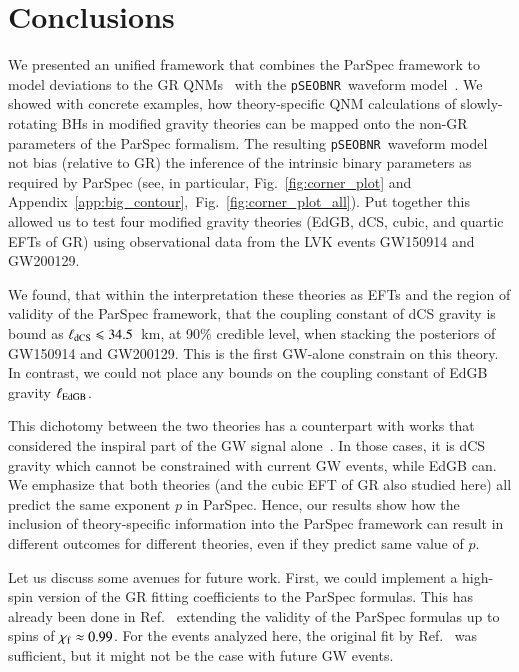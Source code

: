 \documentclass[twocolumn,
               prd,
               aps,
               superscriptaddress,
               tightenlines,
               nofootinbib,
               eqsecnum,
               amsfonts,
               amsmath,
               longbibliography]{revtex4-1}
\newcommand{\pSEOB}{\texttt{pSEOBNR}}
\newcommand{\hscomm}[1]{{\textcolor{TealBlue}{{[HS: #1]}}}}
\begin{document}
\section{Conclusions}
\label{sec:conclusions}

We presented an unified framework that combines the ParSpec framework
to model deviations to the GR QNMs~\cite{Maselli:2019mjd} with the \pSEOB~waveform model~\cite{Brito:2018rfr,Ghosh:2021mrv}.
%
We showed with concrete examples, how theory-specific QNM calculations of
slowly-rotating BHs in modified gravity theories can be mapped onto the
non-GR parameters of the ParSpec formalism.
%
The resulting \pSEOB~waveform model not bias (relative to GR) the inference of
the intrinsic binary parameters as required by ParSpec (see, in particular, Fig.~\ref{fig:corner_plot} and
Appendix~\ref{app:big_contour},~Fig.~\ref{fig:corner_plot_all}).
%
Put together this allowed us to test four modified gravity theories (EdGB, dCS,
cubic, and quartic EFTs of GR) using observational data from the LVK events
GW150914 and GW200129.

We found, that within the interpretation these theories as EFTs and the
region of validity of the ParSpec framework, that the coupling constant of dCS gravity is bound as
$\ell_{\rm dCS} \leqslant 34.5$~km, at 90\% credible level, when stacking the posteriors
of GW150914 and GW200129. This is the first GW-alone constrain on this theory.
%
In contrast, we could not place any bounds on the coupling constant of EdGB
gravity $\ell_{\rm EdGB}$.

This dichotomy between the two theories has a counterpart with works that considered
the inspiral part of the GW signal alone~\cite{Nair:2019iur,Perkins:2021mhb,Lyu:2022gdr}.
%
In those cases, it is dCS gravity which cannot be constrained with current GW
events, while EdGB can.
%
We emphasize that both theories (and the cubic EFT of GR also studied here) all predict the same exponent $p$ in ParSpec.
%
Hence, our results show how the inclusion of theory-specific information into the ParSpec framework
can result in different outcomes for different theories, even if they predict same value of $p$.


Let us discuss some avenues for future work.
%
First, we could implement a high-spin version of the GR fitting coefficients to the ParSpec formulas.
%
This has already been done in Ref.~\cite{Carullo:2021dui} extending the validity of the ParSpec formulas up to
spins of $\chi_{\rm f} \approx 0.99$.
%
For the events analyzed here, the original fit by Ref.~\cite{Maselli:2019mjd}
was sufficient, but it might not be the case with future GW events.
\end{document}
